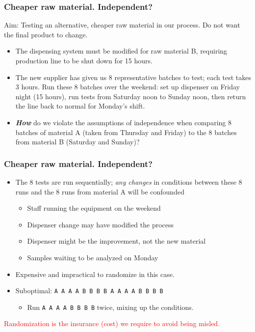 \begin{frame}\frametitle{Cheaper raw material. Independent?}

	Aim: Testing an alternative, cheaper raw material in our process. Do not want the final product to change.
	\begin{itemize}
		\item	The dispensing system must be modified for raw material B, requiring production line to be shut down for 15 hours.
	\end{itemize}
	\begin{itemize}
		\item	The new supplier has given us 8 representative batches to test; each test takes 3 hours. Run these 8 batches over the weekend: set up dispenser on Friday night (15 hours), run tests from Saturday noon to Sunday noon, then return the line back to normal for Monday's shift.
	\end{itemize}
	\begin{itemize}
		\item\textbf{\emph{How}} do we violate the assumptions of independence when comparing 8 batches of material A (taken from Thursday and Friday) to the 8 batches from material B (Saturday and Sunday)?
	\end{itemize}
\end{frame}

\begin{frame}\frametitle{Cheaper raw material. Independent?}
	\begin{itemize}
		\item	The 8 tests are run sequentially; \emph{any changes} in conditions between these 8 runs and the 8 runs from material A will be confounded
		\begin{itemize}
			\item	Staff running the equipment on the weekend
			\item	Dispenser change may have modified the process
			\item	Dispenser might be the improvement, not the new material
			\item	Samples waiting to be analyzed on Monday
		\end{itemize}
	\end{itemize}
	\begin{itemize}
		\item	Expensive and impractical to randomize in this case.
		\item	Suboptimal: \texttt{A A A A B B B B A A A A B B B B}
		\begin{itemize}
			\item	Run \texttt{A A A A B B B B} twice, mixing up the conditions.
		\end{itemize}
	\end{itemize}

	\textcolor{red}{Randomization is the insurance (cost) we require to avoid being misled.}
\end{frame}

